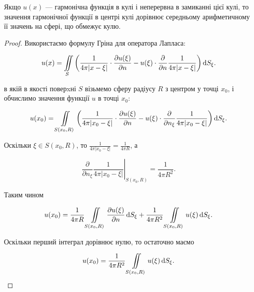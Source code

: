 \begin{theorem}
	Якщо $u(x)$ --- гармонічна функція в кулі і неперервна в замиканні цієї кулі, то значення гармонічної функції в центрі кулі дорівнює середньому арифметичному її значень на сфері, що обмежує кулю.
\end{theorem}

\begin{proof}
	Використаємо формулу Гріна для оператора Лапласа:

	\begin{equation}
		u(x) = \displaystyle\iint\limits_S \left( \frac{1}{4 \pi |x - \xi|} \cdot \frac{\partial u(\xi)}{\partial n} - u(\xi) \cdot \frac{\partial}{\partial n} \frac{1}{4 \pi |x - \xi|} \right) \mathop{}\!\mathrm{d} S_\xi.
	\end{equation}

	в якій в якості поверxні $S$ візьмемо сферу радіусу $R$ з центром у точці $x_0$, і обчислимо значення функції $u$ в точці $x_0$:

	\begin{equation}
		u(x_0) = \displaystyle\iint\limits_{S(x_0, R)} \left( \frac{1}{4 \pi |x_0 - \xi|} \cdot \frac{\partial u(\xi)}{\partial n} - u(\xi) \cdot \frac{\partial}{\partial n_\xi} \frac{1}{4 \pi |x_0 - \xi|} \right) \mathop{}\!\mathrm{d} S_\xi.
	\end{equation}
	 
	Оскільки $\xi \in S(x_0, R)$, то $\frac{1}{4 \pi |x_0 - \xi|} = \frac{1}{4 \pi R}$, а

	\begin{equation}
		\left. \frac{\partial}{\partial n_\xi} \frac{1}{4 \pi |x_0 - \xi|} \right|_{S(x_0, R)} = \frac{1}{4 \pi R^2}.
	\end{equation}

	Таким чином 

	\begin{equation}
		u(x_0) = \frac{1}{4 \pi R} \displaystyle\iint\limits_{S(x_0, R)} \frac{\partial u(\xi)}{\partial n} \mathop{}\!\mathrm{d} S_\xi + \frac{1}{4 \pi R^2} \displaystyle\iint\limits_{S(x_0, R)} u(\xi) \mathop{}\!\mathrm{d} S_\xi.
	\end{equation}

	Оскільки перший інтеграл дорівнює нулю, то остаточно маємо

	\begin{equation}
		u(x_0) = \frac{1}{4 \pi R^2} \displaystyle\iint\limits_{S(x_0, R)} u(\xi) \mathop{}\!\mathrm{d} S_\xi .
	\end{equation}
\end{proof}

